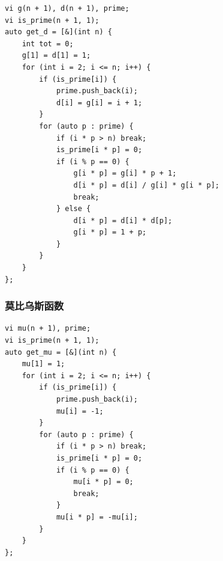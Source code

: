 \documentclass[UTF8, a4paper, titlepage, twoside]{ctexart}
\begin{document}
\begin{lstlisting}[style=cpp]
vi g(n + 1), d(n + 1), prime;
vi is_prime(n + 1, 1);
auto get_d = [&](int n) {
    int tot = 0;
    g[1] = d[1] = 1;
    for (int i = 2; i <= n; i++) {
        if (is_prime[i]) {
            prime.push_back(i);
            d[i] = g[i] = i + 1;
        }
        for (auto p : prime) {
            if (i * p > n) break;
            is_prime[i * p] = 0;
            if (i % p == 0) {
                g[i * p] = g[i] * p + 1;
                d[i * p] = d[i] / g[i] * g[i * p];
                break;
            } else {
                d[i * p] = d[i] * d[p];
                g[i * p] = 1 + p;
            }
        }
    }
};
\end{lstlisting}

\subsubsection*{ 莫比乌斯函数 }

\begin{lstlisting}[style=cpp]
vi mu(n + 1), prime;
vi is_prime(n + 1, 1);
auto get_mu = [&](int n) {
    mu[1] = 1;
    for (int i = 2; i <= n; i++) {
        if (is_prime[i]) {
            prime.push_back(i);
            mu[i] = -1;
        }
        for (auto p : prime) {
            if (i * p > n) break;
            is_prime[i * p] = 0;
            if (i % p == 0) {
                mu[i * p] = 0;
                break;
            }
            mu[i * p] = -mu[i];
        }
    }
};
\end{lstlisting}
\end{document}
